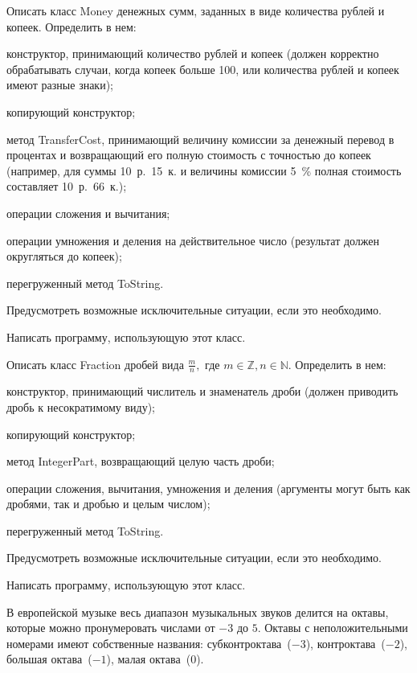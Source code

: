 \task Описать класс Money денежных сумм, заданных в виде количества рублей и копеек.
 Определить в нем:
\begin{itemize*}
\item конструктор, принимающий количество рублей и копеек (должен
  корректно обрабатывать случаи, когда копеек больше 100, или
  количества рублей и копеек имеют разные знаки);
\item копирующий конструктор;
\item метод TransferCost, принимающий величину комиссии за денежный
  перевод в процентах и возвращающий его полную стоимость с точностью
  до копеек (например, для суммы 10~р.~15~к. и величины комиссии 5~\%
  полная стоимость составляет 10~р.~66~к.);
\item операции сложения и вычитания;
\item операции умножения и деления на действительное число (результат
  должен округляться до копеек);
\item перегруженный метод ToString.
\end{itemize*}

Предусмотреть возможные исключительные ситуации, если это необходимо.

Написать программу, использующую этот класс.

\task Описать класс Fraction дробей вида $\frac{m}{n},$ где $m \in
\mathbb{Z}, n \in \mathbb{N}$.  Определить в нем:
\begin{itemize*}
\item конструктор, принимающий числитель и знаменатель дроби (должен
  приводить дробь к несократимому виду);
\item копирующий конструктор;
\item метод IntegerPart, возвращающий целую часть дроби;
\item операции сложения, вычитания, умножения и деления (аргументы
  могут быть как дробями, так и дробью и целым числом);
\item перегруженный метод ToString.
\end{itemize*}

Предусмотреть возможные исключительные ситуации, если это необходимо.

Написать программу, использующую этот класс.

\task В европейской музыке весь диапазон музыкальных звуков делится на
октавы, которые можно пронумеровать числами от $-3$ до $5$. Октавы с
неположительными номерами имеют собственные названия:
субконтроктава~($-3$), контроктава~($-2$), большая октава~($-1$),
малая октава~($0$).

